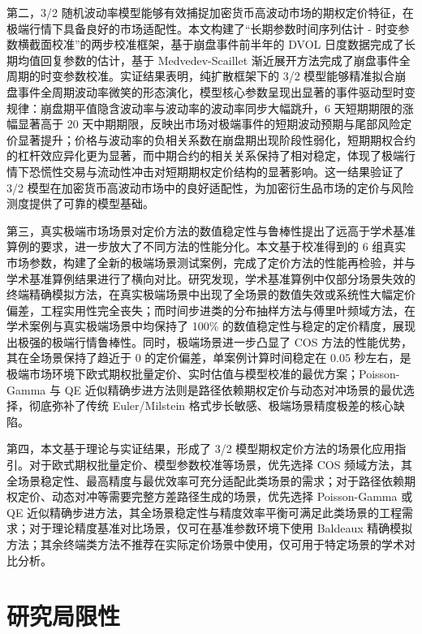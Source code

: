 第二，3/2 随机波动率模型能够有效捕捉加密货币高波动市场的期权定价特征，在极端行情下具备良好的市场适配性。本文构建了“长期参数时间序列估计 - 时变参数横截面校准”的两步校准框架，基于崩盘事件前半年的 DVOL 日度数据完成了长期均值回复参数的估计，基于 Medvedev-Scaillet 渐近展开方法完成了崩盘事件全周期的时变参数校准。实证结果表明，纯扩散框架下的 3/2 模型能够精准拟合崩盘事件全周期波动率微笑的形态演化，模型核心参数呈现出显著的事件驱动型时变规律：崩盘期平值隐含波动率与波动率的波动率同步大幅跳升，6 天短期期限的涨幅显著高于 20 天中期期限，反映出市场对极端事件的短期波动预期与尾部风险定价显著提升；价格与波动率的负相关系数在崩盘期出现阶段性弱化，短期期权合约的杠杆效应异化更为显著，而中期合约的相关关系保持了相对稳定，体现了极端行情下恐慌性交易与流动性冲击对短期期权定价结构的显著影响。这一结果验证了 3/2 模型在加密货币高波动市场中的良好适配性，为加密衍生品市场的定价与风险测度提供了可靠的模型基础。

第三，真实极端市场场景对定价方法的数值稳定性与鲁棒性提出了远高于学术基准算例的要求，进一步放大了不同方法的性能分化。本文基于校准得到的 6 组真实市场参数，构建了全新的极端场景测试案例，完成了定价方法的性能再检验，并与学术基准算例结果进行了横向对比。研究发现，学术基准算例中仅部分场景失效的终端精确模拟方法，在真实极端场景中出现了全场景的数值失效或系统性大幅定价偏差，工程实用性完全丧失；而时间步进类的分布抽样方法与傅里叶频域方法，在学术案例与真实极端场景中均保持了 100\% 的数值稳定性与稳定的定价精度，展现出极强的极端行情鲁棒性。同时，极端场景进一步凸显了 COS 方法的性能优势，其在全场景保持了趋近于 0 的定价偏差，单案例计算时间稳定在 0.05 秒左右，是极端市场环境下欧式期权批量定价、实时估值与模型校准的最优方案；Poisson-Gamma 与 QE 近似精确步进方法则是路径依赖期权定价与动态对冲场景的最优选择，彻底弥补了传统 Euler/Milstein 格式步长敏感、极端场景精度极差的核心缺陷。

第四，本文基于理论与实证结果，形成了 3/2 模型期权定价方法的场景化应用指引。对于欧式期权批量定价、模型参数校准等场景，优先选择 COS 频域方法，其全场景稳定性、最高精度与最优效率可充分适配此类场景的需求；对于路径依赖期权定价、动态对冲等需要完整方差路径生成的场景，优先选择 Poisson-Gamma 或 QE 近似精确步进方法，其全场景稳定性与精度效率平衡可满足此类场景的工程需求；对于理论精度基准对比场景，仅可在基准参数环境下使用 Baldeaux 精确模拟方法；其余终端类方法不推荐在实际定价场景中使用，仅可用于特定场景的学术对比分析。

\section{研究局限性}

